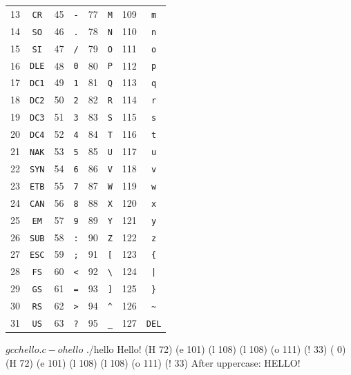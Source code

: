 \documentclass[12pt, oneside, landscape]{article}
\begin{document}
\begin{minipage}[t]{0.45\textwidth}
\begin{tabular}{|c|c||c|c||c|c||c|c|}
13  & \texttt{CR}  & 45  & \texttt{-} & 77  & \texttt{M} & 109 & \texttt{m} \\
14  & \texttt{SO}  & 46  & \texttt{.} & 78  & \texttt{N} & 110 & \texttt{n} \\
15  & \texttt{SI}  & 47  & \texttt{/} & 79  & \texttt{O} & 111 & \texttt{o} \\
16  & \texttt{DLE} & 48  & \texttt{0} & 80  & \texttt{P} & 112 & \texttt{p} \\
17  & \texttt{DC1} & 49  & \texttt{1} & 81  & \texttt{Q} & 113 & \texttt{q} \\
18  & \texttt{DC2} & 50  & \texttt{2} & 82  & \texttt{R} & 114 & \texttt{r} \\
19  & \texttt{DC3} & 51  & \texttt{3} & 83  & \texttt{S} & 115 & \texttt{s} \\
20  & \texttt{DC4} & 52  & \texttt{4} & 84  & \texttt{T} & 116 & \texttt{t} \\
21  & \texttt{NAK} & 53  & \texttt{5} & 85  & \texttt{U} & 117 & \texttt{u} \\
22  & \texttt{SYN} & 54  & \texttt{6} & 86  & \texttt{V} & 118 & \texttt{v} \\
23  & \texttt{ETB} & 55  & \texttt{7} & 87  & \texttt{W} & 119 & \texttt{w} \\
24  & \texttt{CAN} & 56  & \texttt{8} & 88  & \texttt{X} & 120 & \texttt{x} \\
25  & \texttt{EM}  & 57  & \texttt{9} & 89  & \texttt{Y} & 121 & \texttt{y} \\
26  & \texttt{SUB} & 58  & \texttt{:} & 90  & \texttt{Z} & 122 & \texttt{z} \\
27  & \texttt{ESC} & 59  & \texttt{;} & 91  & \texttt{[} & 123 & \texttt{\{} \\
28  & \texttt{FS}  & 60  & \texttt{<} & 92  & \texttt{\textbackslash} & 124 & \texttt{|} \\
29  & \texttt{GS}  & 61  & \texttt{=} & 93  & \texttt{]} & 125 & \texttt{\}} \\
30  & \texttt{RS}  & 62  & \texttt{>} & 94  & \texttt{\^{}} & 126 & \texttt{\~{}} \\
31  & \texttt{US}  & 63  & \texttt{?} & 95  & \texttt{\_} & 127 & \texttt{DEL} \\
\hline
\end{tabular}
\end{minipage}

\newpage

  
\begin{shell}[linewidth=30em,basicstyle=\ttfamily\scriptsize]
$ gcc hello.c -o hello
$ ./hello             
Hello!
(H 72) (e 101) (l 108) (l 108) (o 111) (! 33) ( 0)
(H 72) (e 101) (l 108) (l 108) (o 111) (! 33) 
After uppercase: HELLO!
\end{shell}
\end{document}
